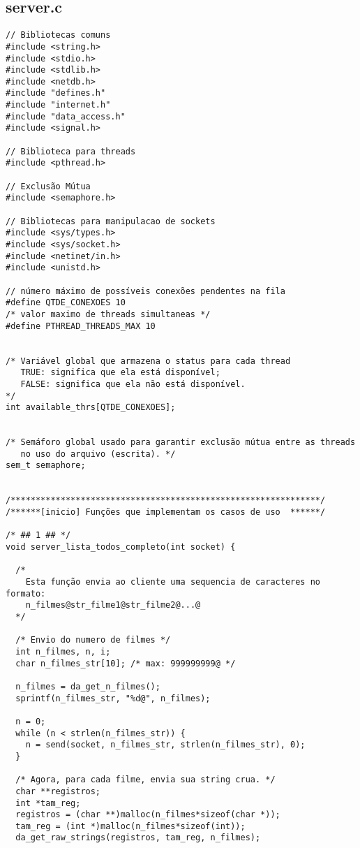 \documentclass[11pt,twoside]{article}
\begin{document}
\subsection{server.c}       %
\begin{verbatim}
// Bibliotecas comuns
#include <string.h>
#include <stdio.h>
#include <stdlib.h>
#include <netdb.h>
#include "defines.h"
#include "internet.h"
#include "data_access.h"
#include <signal.h>

// Biblioteca para threads
#include <pthread.h>

// Exclusão Mútua
#include <semaphore.h>

// Bibliotecas para manipulacao de sockets
#include <sys/types.h>
#include <sys/socket.h>
#include <netinet/in.h>
#include <unistd.h>

// número máximo de possíveis conexões pendentes na fila
#define QTDE_CONEXOES 10 
/* valor maximo de threads simultaneas */
#define PTHREAD_THREADS_MAX 10  


/* Variável global que armazena o status para cada thread
   TRUE: significa que ela está disponível;
   FALSE: significa que ela não está disponível.
*/
int available_thrs[QTDE_CONEXOES];


/* Semáforo global usado para garantir exclusão mútua entre as threads 
   no uso do arquivo (escrita). */
sem_t semaphore;


/**************************************************************/
/******[inicio] Funções que implementam os casos de uso  ******/

/* ## 1 ## */
void server_lista_todos_completo(int socket) {

  /*
    Esta função envia ao cliente uma sequencia de caracteres no formato:
    n_filmes@str_filme1@str_filme2@...@
  */

  /* Envio do numero de filmes */
  int n_filmes, n, i;
  char n_filmes_str[10]; /* max: 999999999@ */

  n_filmes = da_get_n_filmes();
  sprintf(n_filmes_str, "%d@", n_filmes);

  n = 0;
  while (n < strlen(n_filmes_str)) {
    n = send(socket, n_filmes_str, strlen(n_filmes_str), 0);
  }

  /* Agora, para cada filme, envia sua string crua. */
  char **registros;
  int *tam_reg;
  registros = (char **)malloc(n_filmes*sizeof(char *));
  tam_reg = (int *)malloc(n_filmes*sizeof(int));
  da_get_raw_strings(registros, tam_reg, n_filmes);


\end{verbatim}
\end{document}
